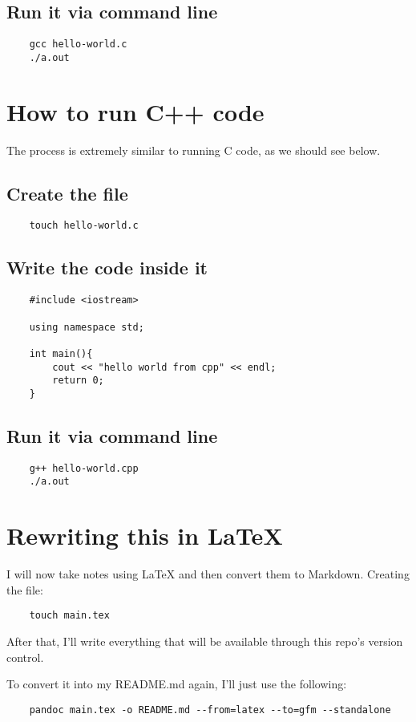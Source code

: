 \documentclass{article}
\begin{document}
\subsection{Run it via command line}
\begin{verbatim}
    gcc hello-world.c 
    ./a.out 
\end{verbatim}

\section{How to run C++ code}
The process is extremely similar to running C code, as we should see below.

\subsection{Create the file}
\begin{verbatim}
    touch hello-world.c
\end{verbatim}

\subsection{Write the code inside it}
\begin{verbatim}
    #include <iostream>

    using namespace std;

    int main(){
        cout << "hello world from cpp" << endl;
        return 0;
    }
\end{verbatim}

\subsection{Run it via command line}
\begin{verbatim}
    g++ hello-world.cpp
    ./a.out 
\end{verbatim}

\section{Rewriting this in \LaTeX}
I will now take notes using \LaTeX{} and then convert them to Markdown. Creating the file:

\begin{verbatim}
    touch main.tex
\end{verbatim}

After that, I'll write everything that will be available through this repo's version control.

To convert it into my README.md again, I'll just use the following:
\begin{verbatim}
    pandoc main.tex -o README.md --from=latex --to=gfm --standalone
\end{verbatim}



\end{document}
